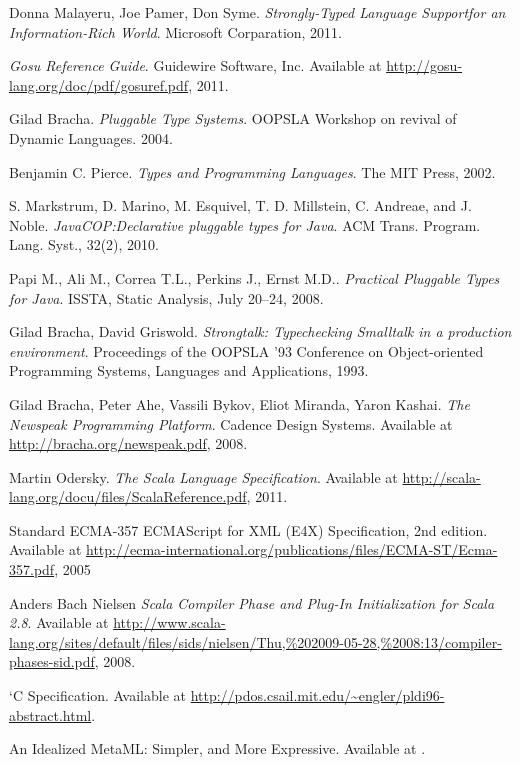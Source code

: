 \begin{thebibliography}{9}

    Donna Malayeru, Joe Pamer, Don Syme.
    \emph{Strongly-Typed Language Supportfor an Information-Rich World}.
    Microsoft Corparation,
    2011.

    \emph{Gosu Reference Guide}.
    Guidewire Software, Inc.
    Available at \url{http://gosu-lang.org/doc/pdf/gosuref.pdf},
    2011.

    Gilad Bracha.
    \emph{Pluggable Type Systems}.
    OOPSLA Workshop on revival of Dynamic Languages.
    2004.

    Benjamin C. Pierce.
    \emph{Types and Programming Languages}.
    The MIT Press, 2002.

    S. Markstrum, D. Marino, M. Esquivel, T. D. Millstein, C. Andreae, and J. Noble.
    \emph{JavaCOP:\@ Declarative pluggable types for Java}.
    ACM Trans. Program. Lang. Syst., 32(2), 2010.

    Papi M., Ali M., Correa T.L., Perkins J., Ernst M.D..
    \emph{Practical Pluggable Types for Java}.
    ISSTA, Static Analysis, July 20–24, 2008.

    Gilad Bracha, David Griswold.
    \emph{Strongtalk: Typechecking Smalltalk in a production environment}.
    Proceedings of the OOPSLA '93 Conference on Object-oriented Programming Systems, Languages and Applications, 1993.

    Gilad Bracha, Peter Ahe, Vassili Bykov, Eliot Miranda, Yaron Kashai.
    \emph{The Newspeak Programming Platform}.
    Cadence Design Systems.
    Available at \url{http://bracha.org/newspeak.pdf},
    2008.

    Martin Odersky.
    \emph{The Scala Language Specification}.
    Available at \url{http://scala-lang.org/docu/files/ScalaReference.pdf},
    2011.

    Standard ECMA-357
    ECMAScript for XML (E4X) Specification,
    2nd edition.
    Available at \url{http://ecma-international.org/publications/files/ECMA-ST/Ecma-357.pdf},
    2005

    Anders Bach Nielsen
    \emph{Scala Compiler Phase and Plug-In Initialization for Scala 2.8}.
    Available at \url{http://www.scala-lang.org/sites/default/files/sids/nielsen/Thu,%202009-05-28,%2008:13/compiler-phases-sid.pdf},
    2008.

    `C Specification.
    Available at \url{http://pdos.csail.mit.edu/~engler/pldi96-abstract.html}.

    An Idealized MetaML: Simpler, and More Expressive.
    Available at \url{}.

\end{thebibliography}